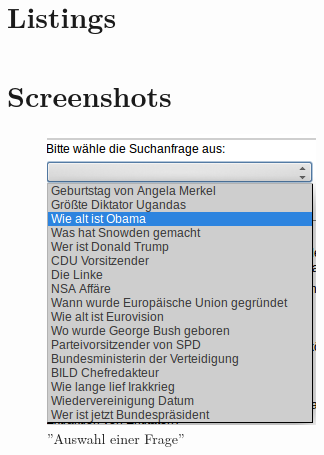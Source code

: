 \chapter{Listings}

\lstset{language=Java}


\lstset{language=Java}


\lstset{language=Java}


\lstset{language=python}


\lstset{language=Java}



\clearpage
\chapter{Screenshots}

\begin{figure}
\centering
\includegraphics[width=.6\textwidth]{Bilder/select-question.png}
\caption{''Auswahl einer Frage''}
\label{fig:eval-select-question}
\end{figure}

